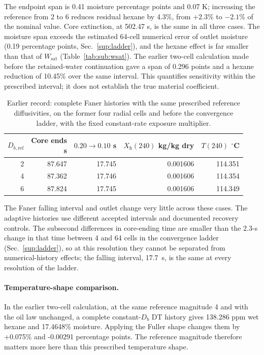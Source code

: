 The endpoint span is 0.41 moisture percentage points and 0.07 K; increasing the reference from 2 to 6 reduces residual hexane by 4.3\%, from $+2.3$\% to $-2.1$\% of the nominal value. Core extinction, at 502.47 s, is the same in all three cases. The moisture span exceeds the estimated 64-cell numerical error of outlet moisture (0.19 percentage points, Sec.~\ref{sup:ladder}), and the hexane effect is far smaller than that of $W_{\mathrm{sat}}$ (Table~\ref{tab:sub:wsat}). The earlier two-cell calculation made before the retained-water continuation gave a span of 0.296 points and a hexane reduction of 10.45\% over the same interval. This quantifies sensitivity within the prescribed interval; it does not establish the true material coefficient.

\begin{table}[htbp]\centering\small
\caption{Earlier record: complete Faner histories with the same prescribed
reference diffusivities, on the former four radial cells and before the
convergence ladder, with the fixed constant-rate exposure multiplier.}
\label{tab:temperatureproperties:faner}
\begin{tabular}{@{}rrrrr@{}}\toprule
$D_{b,\mathrm{ref}}$ & \shortstack{Core ends\\s} & \shortstack{$0.20\to0.10$\\s} & \shortstack{$X_{\mathrm h}(240)$\\kg/kg dry} & \shortstack{$T(240)$\\$^\circ$C}\\\midrule
2 & 87.647 & 17.745 & 0.001606 & 114.351\\
4 & 87.362 & 17.746 & 0.001606 & 114.354\\
6 & 87.824 & 17.745 & 0.001606 & 114.349\\
\bottomrule\end{tabular}\end{table}

The Faner falling interval and outlet change very little across these cases. The adaptive histories use different accepted intervals and documented recovery controls. The subsecond differences in core-ending time are smaller than the 2.3-s change in that time between 4 and 64 cells in the convergence ladder (Sec.~\ref{sup:ladder}), so at this resolution they cannot be separated from numerical-history effects; the falling interval, 17.7~s, is the same at every resolution of the ladder.

\paragraph{Temperature-shape comparison.}
In the earlier two-cell calculation, at the same reference magnitude 4 and with the oil law unchanged, a complete constant-$D_b$ DT history gives 138.286 ppm wet hexane and 17.4648\% moisture. Applying the Fuller shape changes them by +0.075\% and -0.00291 percentage points. The reference magnitude therefore matters more here than this prescribed temperature shape.

